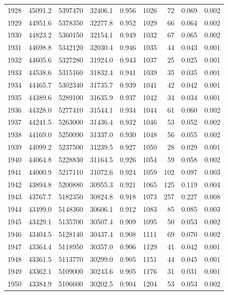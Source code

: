 \documentclass[
]{scrartcl}
\begin{document}
\begin{table}
{\begin{tabular*}{\linewidth}{@{\extracolsep{\fill}}rrrrrrrrr}
1928 & 45091.2 & 5397470 & 32406.1 & 0.956 & 1026 & 72 & 0.069 & 0.002 \\ 
1929 & 44951.6 & 5378350 & 32277.8 & 0.952 & 1029 & 66 & 0.064 & 0.002 \\ 
1930 & 44823.2 & 5360150 & 32154.1 & 0.949 & 1032 & 67 & 0.065 & 0.002 \\ 
1931 & 44698.8 & 5342120 & 32030.4 & 0.946 & 1035 & 44 & 0.043 & 0.001 \\ 
1932 & 44605.6 & 5327280 & 31924.0 & 0.943 & 1037 & 25 & 0.025 & 0.001 \\ 
1933 & 44538.6 & 5315160 & 31832.4 & 0.941 & 1039 & 35 & 0.035 & 0.001 \\ 
1934 & 44465.7 & 5302340 & 31735.7 & 0.939 & 1041 & 42 & 0.042 & 0.001 \\ 
1935 & 44389.6 & 5289100 & 31635.9 & 0.937 & 1042 & 34 & 0.034 & 0.001 \\ 
1936 & 44328.0 & 5277410 & 31544.1 & 0.934 & 1044 & 61 & 0.060 & 0.002 \\ 
1937 & 44241.5 & 5263000 & 31436.4 & 0.932 & 1046 & 53 & 0.052 & 0.002 \\ 
1938 & 44169.0 & 5250090 & 31337.0 & 0.930 & 1048 & 56 & 0.055 & 0.002 \\ 
1939 & 44099.2 & 5237500 & 31239.5 & 0.927 & 1050 & 28 & 0.029 & 0.001 \\ 
1940 & 44064.8 & 5228830 & 31164.5 & 0.926 & 1054 & 59 & 0.058 & 0.002 \\ 
1941 & 44000.9 & 5217110 & 31072.6 & 0.924 & 1059 & 102 & 0.097 & 0.003 \\ 
1942 & 43894.8 & 5200880 & 30955.3 & 0.921 & 1065 & 125 & 0.119 & 0.004 \\ 
1943 & 43767.7 & 5182350 & 30824.8 & 0.918 & 1073 & 257 & 0.227 & 0.008 \\ 
1944 & 43499.0 & 5148360 & 30606.1 & 0.912 & 1083 & 85 & 0.085 & 0.003 \\ 
1945 & 43429.1 & 5135700 & 30507.4 & 0.909 & 1095 & 50 & 0.053 & 0.002 \\ 
1946 & 43404.5 & 5128140 & 30437.4 & 0.908 & 1111 & 69 & 0.070 & 0.002 \\ 
1947 & 43364.4 & 5118950 & 30357.0 & 0.906 & 1129 & 41 & 0.042 & 0.001 \\ 
1948 & 43361.5 & 5113770 & 30299.0 & 0.905 & 1151 & 44 & 0.045 & 0.001 \\ 
1949 & 43362.1 & 5109000 & 30243.6 & 0.905 & 1176 & 31 & 0.031 & 0.001 \\ 
1950 & 43384.9 & 5106600 & 30202.5 & 0.904 & 1204 & 53 & 0.053 & 0.002 \\ 

\end{tabular*}}
\end{table}
\end{document}
